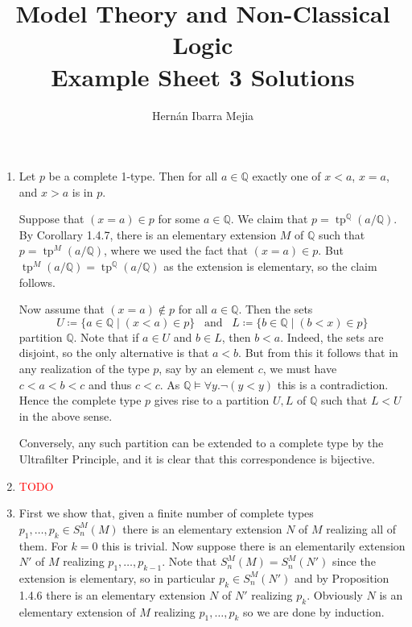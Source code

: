 \documentclass{article}
\theoremstyle{theorem}
\DeclareMathOperator{\tp}{tp}
\begin{document}
	\title{Model Theory and Non-Classical Logic\\ Example Sheet 3 Solutions}
	\author{Hernán Ibarra Mejia}
	\maketitle
	\begin{enumerate}[leftmargin=*]
		\item Let $p$ be a complete 1-type. Then for all $a\in \mathbb{Q}$ exactly one of $x<a$, $x=a$, and $x>a$ is in $p$.
		
		Suppose that $(x=a)\in p$ for some $a\in\mathbb{Q}$. We claim that $p = \tp^\mathbb{Q}(a/\mathbb{Q})$. By Corollary 1.4.7, there is an elementary extension $M$ of $\mathbb{Q}$ such that $p = \tp^{M}(a/\mathbb{Q})$, where we used the fact that $(x=a)\in p$. But $\tp^{M}(a/\mathbb{Q})=\tp^\mathbb{Q}(a/\mathbb{Q})$ as the extension is elementary, so the claim follows.
		
		Now assume that $(x=a)\notin p$ for all $a\in\mathbb{Q}$. Then the sets
		\[
			U\coloneqq \{a\in\mathbb{Q}\mid (x<a)\in p\} \,\,\,\text{ and }\,\,\, L\coloneqq \{b\in\mathbb{Q} \mid (b<x)\in p\}
		\]
		partition $\mathbb{Q}$. Note that if $a\in U$ and $b\in L$, then $b<a$. Indeed, the sets are disjoint, so the only alternative is that $a<b$. But from this it follows that in any realization of the type $p$, say by an element $c$, we must have $c<a<b<c$ and thus $c<c$. As $\mathbb{Q}\models \forall y. \neg(y<y)$ this is a contradiction. Hence the complete type $p$ gives rise to a partition $U,L$ of $\mathbb{Q}$ such that $L<U$ in the above sense.
		
		Conversely, any such partition can be extended to a complete type by the Ultrafilter Principle, and it is clear that this correspondence is bijective.
		
		\item \textcolor{red}{TODO}	
		\item First we show that, given a finite number of complete types $p_1,\ldots,p_k\in S_{n}^M(M)$ there is an elementary extension $N$ of $M$ realizing all of them. For $k=0$ this is trivial. Now suppose there is an elementarily extension $N'$ of $M$ realizing $p_1,\ldots,p_{k-1}$. Note that $S_{n}^M(M)= S_n^{M}(N')$ since the extension is elementary, so in particular $p_k\in S_n^{M}(N')$ and by Proposition 1.4.6 there is an elementary extension $N$ of $N'$ realizing $p_k$. Obviously $N$ is an elementary extension of $M$ realizing $p_1,\ldots, p_k$ so we are done by induction.
		

\end{enumerate}
\end{document}
